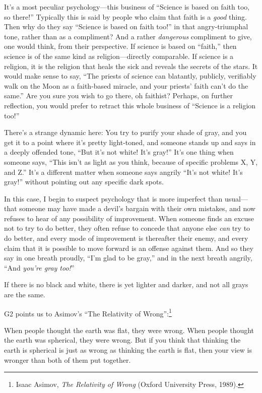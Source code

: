 {
 It's a most peculiar psychology---this business of
``Science is based on faith too, so
there!'' Typically this is said by people who claim
that faith is a \textit{good} thing. Then why do they say
``Science is based on faith too!''
in that angry-triumphal tone, rather than as a compliment? And a rather
\textit{dangerous} compliment to give, one would think, from their
perspective. If science is based on
``faith,'' then science is of the
same kind as religion---directly comparable. If science is a religion,
it is the religion that heals the sick and reveals the secrets of the
stars. It would make sense to say, ``The priests of
science can blatantly, publicly, verifiably walk on the Moon as a
faith-based miracle, and your priests' faith
can't do the same.'' Are you sure you
wish to go there, oh faithist? Perhaps, on further reflection, you
would prefer to retract this whole business of
``Science is a religion too!''}

{
 There's a strange dynamic here: You try to purify
your shade of gray, and you get it to a point where
it's pretty light-toned, and someone stands up and says
in a deeply offended tone, ``But it's
not white! It's gray!''
It's one thing when someone says,
``This isn't as light as you think,
because of specific problems X, Y, and Z.''
It's a different matter when someone says angrily
``It's not white! It's
gray!'' without pointing out any specific dark
spots.}

{
 In this case, I begin to suspect psychology that is more imperfect
than usual---that someone may have made a devil's
bargain with their own mistakes, and now refuses to hear of any
possibility of improvement. When someone finds an excuse not to try to
do better, they often refuse to concede that anyone else \textit{can}
try to do better, and every mode of improvement is thereafter their
enemy, and every claim that it is possible to move forward is an
offense against them. And so they say in one breath proudly,
``I'm glad to be
gray,'' and in the next breath angrily,
``And \textit{you're gray
too!}''}

{
 If there is no black and white, there is yet lighter and darker,
and not all grays are the same.}

{
 G2 points us to Asimov's ``The
Relativity of Wrong'':\footnote{Isaac Asimov, \textit{The Relativity of Wrong} (Oxford
University Press, 1989).}}

{
 When people thought the earth was flat, they were wrong. When
people thought the earth was spherical, they were wrong. But if you
think that thinking the earth is spherical is just as wrong as thinking
the earth is flat, then your view is wronger than both of them put
together.}


